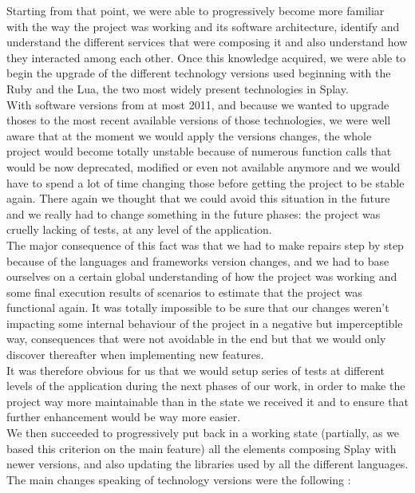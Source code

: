 \documentclass{eplmastersthesis}
\begin{document}
        Starting from that point, we were able to progressively become more
        familiar with the way the project was working and its software
        architecture, identify and understand the different services that
        were composing it and also understand how they interacted among
        each other. Once this knowledge acquired, we were able to begin the
        upgrade of the different technology versions used beginning with the
        Ruby and the Lua, the two most widely present technologies in Splay.\\
        With software versions from at most 2011, and because we wanted
        to upgrade thoses to the most recent available versions of those
        technologies, we were well aware that at the moment we would apply the
        versions changes, the whole project would become totally unstable
        because of numerous function calls that would be now deprecated,
        modified or even not available anymore and we would have to spend a lot
        of time changing those before getting the project to be stable again.
        There again we thought that we could avoid this situation in the future
        and we really had to change something in the future phases: the project
        was cruelly lacking of tests, at any level of the application.\\


        The major consequence of this fact was that we had to make repairs
        step by step because of the languages and frameworks version changes,
        and we had to base ourselves on a certain global understanding of how
        the project was working and some final execution results of scenarios
        to estimate that the project was functional again. It was totally
        impossible to be sure that our changes weren't impacting some internal
        behaviour of the project in a negative but imperceptible way,
        consequences that were not avoidable in the end but that we would
        only discover thereafter when implementing new features.\\
        It was therefore obvious for us that we would setup series of tests
        at different levels of the application during the next phases of our
        work, in order to make the project way more maintainable than in the
        state we received it and to ensure that further enhancement would
        be way more easier.\\


        We then succeeded to progressively put back in a working state
        (partially, as we based this criterion on the main feature) all the
        elements composing Splay with newer versions, and also updating the
        libraries used by all the different languages. The main changes
        speaking of technology versions were the following :
\end{document}
